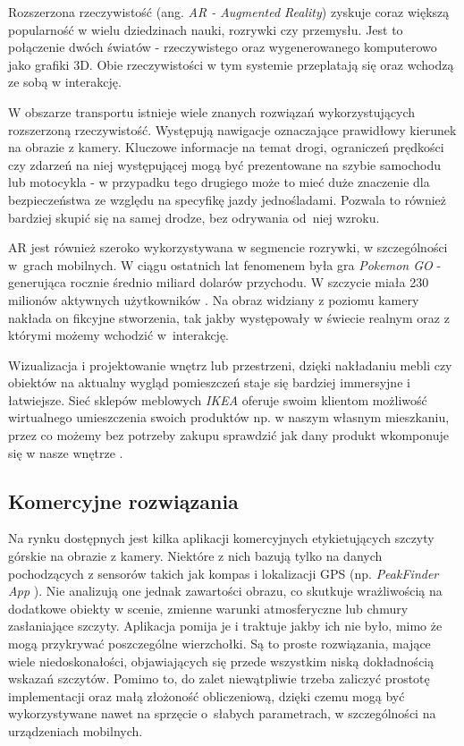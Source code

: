 Rozszerzona rzeczywistość (ang. \textit{AR - Augmented Reality}) \cite{AR} zyskuje coraz większą popularność w wielu dziedzinach nauki, rozrywki czy przemysłu. Jest to połączenie dwóch światów - rzeczywistego oraz wygenerowanego komputerowo jako grafiki 3D. Obie rzeczywistości w tym systemie przeplatają się oraz wchodzą ze sobą w interakcję. 

\par

W obszarze transportu istnieje wiele znanych rozwiązań wykorzystujących rozszerzoną rzeczywistość. Występują nawigacje oznaczające prawidłowy kierunek na obrazie z kamery. Kluczowe informacje na temat drogi, ograniczeń prędkości czy zdarzeń na niej występującej mogą być prezentowane na szybie samochodu lub motocykla - w przypadku tego drugiego może to mieć duże znaczenie dla bezpieczeństwa ze względu na specyfikę jazdy jednośladami. Pozwala to również bardziej skupić się na samej drodze, bez odrywania od~niej wzroku. 

\par

AR jest również szeroko wykorzystywana w segmencie rozrywki, w szczególności w~grach mobilnych. W ciągu ostatnich lat fenomenem była gra \textit{Pokemon GO} - generująca rocznie średnio miliard dolarów przychodu. W szczycie miała 230 milionów aktywnych użytkowników \cite{pokemongo_usage}. Na obraz widziany z poziomu kamery nakłada on fikcyjne stworzenia, tak jakby występowały w świecie realnym oraz z którymi możemy wchodzić w~interakcję.

\par

Wizualizacja i projektowanie wnętrz lub przestrzeni, dzięki nakładaniu mebli czy obiektów na aktualny wygląd pomieszczeń staje się bardziej immersyjne i łatwiejsze. Sieć sklepów meblowych \textit{IKEA} oferuje swoim klientom możliwość wirtualnego umieszczenia swoich produktów np. w naszym własnym mieszkaniu, przez co możemy bez potrzeby zakupu sprawdzić jak dany produkt wkomponuje się w nasze wnętrze \cite{ikea_app}.



\subsection{Komercyjne rozwiązania}

Na rynku dostępnych jest kilka aplikacji komercyjnych etykietujących szczyty górskie na obrazie z kamery. Niektóre z nich bazują tylko na danych pochodzących z sensorów takich jak kompas i lokalizacji GPS (np. \textit{PeakFinder App} \cite{peakfinderapp}). Nie analizują one jednak zawartości obrazu, co skutkuje wrażliwością na dodatkowe obiekty w scenie, zmienne warunki atmosferyczne lub chmury zasłaniające szczyty. Aplikacja pomija je i traktuje jakby ich nie było, mimo że mogą przykrywać poszczególne wierzchołki. Są to proste rozwiązania, mające wiele niedoskonałości, objawiających się przede wszystkim niską dokładnością wskazań szczytów. Pomimo to, do zalet niewątpliwie trzeba zaliczyć prostotę implementacji oraz małą złożoność obliczeniową, dzięki czemu mogą być wykorzystywane nawet na sprzęcie o~słabych parametrach, w szczególności na urządzeniach mobilnych. 
 

